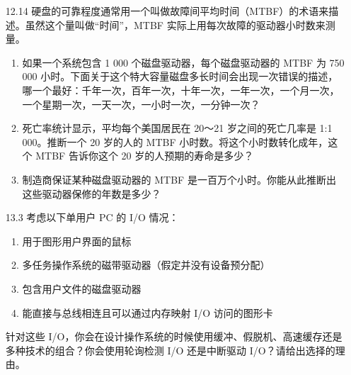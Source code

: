 \documentclass[UTF8]{ctexart}
\begin{document}
\begin{enumerate}
\begin{enumerate}
		\item[12.14] 硬盘的可靠程度通常用一个叫做故障间平均时间（MTBF）的术语来描述。虽然这个量叫做“时间”，MTBF 实际上用每次故障的驱动器小时数来测量。
		\begin{enumerate}
			\item 如果一个系统包含 1 000 个磁盘驱动器，每个磁盘驱动器的 MTBF 为 750 000 小时。下面关于这个特大容量磁盘多长时间会出现一次错误的描述，哪一个最好：千年一次，百年一次，十年一次，一年一次，一个月一次，一个星期一次，一天一次，一小时一次，一分钟一次？
			\item 死亡率统计显示，平均每个美国居民在 20～21 岁之间的死亡几率是 1:1 000。推断一个 20 岁的人的 MTBF 小时数。将这个小时数转化成年，这个 MTBF 告诉你这个 20 岁的人预期的寿命是多少？
			\item 制造商保证某种磁盘驱动器的 MTBF 是一百万个小时。你能从此推断出这些驱动器保修的年数是多少？
		\end{enumerate}
	\end{enumerate}
	
	\begin{enumerate}
		\item[13.3] 考虑以下单用户 PC 的 I/O 情况：
		\begin{enumerate}
			\item 用于图形用户界面的鼠标
			\item 多任务操作系统的磁带驱动器（假定并没有设备预分配）
			\item 包含用户文件的磁盘驱动器
			\item 能直接与总线相连且可以通过内存映射 I/O 访问的图形卡
		\end{enumerate}
		针对这些 I/O，你会在设计操作系统的时候使用缓冲、假脱机、高速缓存还是多种技术的组合？你会使用轮询检测 I/O 还是中断驱动 I/O？请给出选择的理由。
	\end{enumerate}
\end{enumerate}
\end{document}
